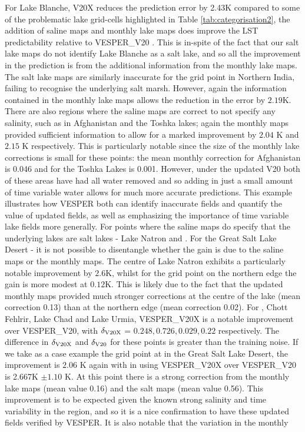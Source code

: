 \documentclass[hess, twostagejnl]{copernicus}
\providecommand{\DIFadd}[1]{{\protect\color{blue} \sf #1}} %
\providecommand{\DIFdel}[1]{{\protect\color{red} \scriptsize #1}} %
\providecommand{\DIFaddbegin}{} %
\providecommand{\DIFaddend}{} %
\providecommand{\DIFdelbegin}{} %
\providecommand{\DIFdelend}{} %
\begin{document}
For \DIFdelbegin \DIFdel{Lake Blanche, V20X reduces the prediction error by 2.43K compared to }\DIFdelend \DIFaddbegin \DIFadd{some of the problematic lake grid-cells highlighted in Table \ref{tab:categorisation2}, the addition of saline maps and monthly lake maps does improve the LST predictability relative to VESPER\_}\DIFaddend V20\DIFdelbegin \DIFdel{. This is in-spite of the fact that our salt lake maps do not identify Lake Blanche as a salt lake, and so all the improvement in the prediction is from the additional information from the monthly lake maps. The salt lake maps are similarly inaccurate for the grid point in Northern India, failing to recognise the underlying salt marsh. However, again the information contained in the monthly lake maps allows the reduction in the error by $2.19$K. There are also regions where the saline maps are correct to not specify any salinity, such as in Afghanistan and the Toshka lakes; again the monthly maps provided sufficient information to allow for a marked improvement by $2.04$ K and $2.15$ K respectively. This is particularly notable since the size of the monthly lake corrections is small for these points: the mean monthly correction for Afghanistan is 0.046 and for the Toshka Lakes is 0.001. However, under the updated V20 both of these areas have had all water removed and so adding in just a small amount of time variable water allows for much more accurate predictions. This example illustrates how VESPER both can identify inaccurate fields and quantify the value of updated fields, as well as emphasizing the importance of time variable lake fields more generally. For points where the saline maps do specify that the underlying lakes are salt lakes - Lake Natron and }\DIFdelend \DIFaddbegin \DIFadd{. For the Great }\DIFaddend Salt Lake Desert\DIFdelbegin \DIFdel{- it is not possible to disentangle whether the gain is due to the saline maps or the monthly maps. The centre of Lake Natron exhibits a particularly notable improvement by $2.6$K, whilst for the grid point on the northern edge the gain is more modest at $0.12$K. This is likely due to the fact that the updated monthly maps provided much stronger corrections at the centre of the lake (mean correction 0.13) than at the northern edge (mean correction 0.02). For }\DIFdelend \DIFaddbegin \DIFadd{, Chott Fehlrir, Lake Chad and Lake Urmia, VESPER\_V20X is a notable improvement over VESPER\_V20, with $\delta_{\rm V20X}$ = $0.248,0.726,0.029,0.22$ respectively. The difference in  $\delta_{\rm V20X}$ and $\delta_{\rm V20}$ for these points is greater than }\DIFaddend the \DIFaddbegin \DIFadd{training noise. If we take as a case example the }\DIFaddend grid point \DIFdelbegin \DIFdel{at }\DIFdelend \DIFaddbegin \DIFadd{in }\DIFaddend the Great Salt Lake Desert, the improvement \DIFdelbegin \DIFdel{is $2.06$ K again with }\DIFdelend \DIFaddbegin \DIFadd{in using  VESPER\_V20X over VESPER\_V20 is 2.667K $\pm 1.10$ K. At this point there is }\DIFaddend a strong correction from the monthly lake maps (mean value 0.16) and the salt maps (mean value 0.56). This improvement is to be expected given the known strong salinity and time variability in the region, and so it is a nice confirmation to have these updated fields verified by VESPER. It is also notable that the variation in the monthly 
\end{document}
